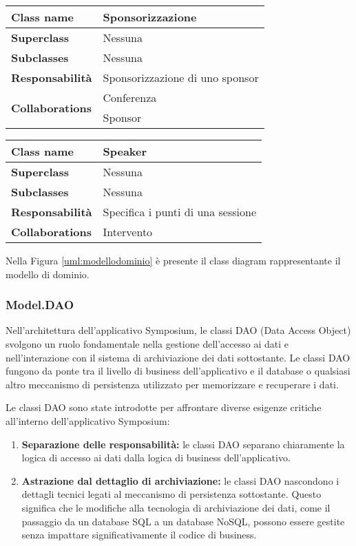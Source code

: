 \begin{table}[h!]
\begin{tabular}{|l|l|}
	\hline
	\textbf{Class name} & Sponsorizzazione \\ \hline
	\textbf{Superclass} & Nessuna \\ \hline
	\textbf{Subclasses} & Nessuna  \\ \hline
	\textbf{Responsabilità} & Sponsorizzazione di uno sponsor \\ \hline
	\multirow{2}{*}{\textbf{Collaborations}} & Conferenza \\ 
	& Sponsor \\ \hline
\end{tabular}
\end{table}

\begin{table}[h!]
\begin{tabular}{|l|l|}
	\hline
	\textbf{Class name} & Speaker \\ \hline
	\textbf{Superclass} & Nessuna \\ \hline
	\textbf{Subclasses} & Nessuna  \\ \hline
	\textbf{Responsabilità} & Specifica i punti di una sessione \\ \hline
	\multirow{1}{*}{\textbf{Collaborations}} & Intervento \\ \hline
\end{tabular}
\end{table}

Nella Figura \ref{uml:modellodominio} è presente il class diagram rappresentante il modello di dominio. 
\subsubsection{Model.DAO}
Nell'architettura dell'applicativo Symposium, le classi DAO (Data Access Object) svolgono un ruolo fondamentale nella gestione dell'accesso ai dati e nell'interazione con il sistema di archiviazione dei dati sottostante. Le classi DAO fungono da ponte tra il livello di business dell'applicativo e il database o qualsiasi altro meccanismo di persistenza utilizzato per memorizzare e recuperare i dati.
\bigskip

Le classi DAO sono state introdotte per affrontare diverse esigenze critiche all'interno dell'applicativo Symposium:
\begin{enumerate}
	\item \textbf{Separazione delle responsabilità:} le classi DAO separano chiaramente la logica di accesso ai dati dalla logica di business dell'applicativo. 
	\item \textbf{Astrazione dal dettaglio di archiviazione:} le classi DAO nascondono i dettagli tecnici legati al meccanismo di persistenza sottostante. Questo significa che le modifiche alla tecnologia di archiviazione dei dati, come il passaggio da un database SQL a un database NoSQL, possono essere gestite senza impattare significativamente il codice di business.
\end{enumerate}

